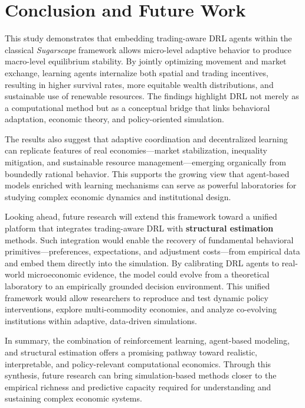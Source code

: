 \documentclass[pdflatex,sn-mathphys-num]{sn-jnl}%
\theoremstyle{thmstyleone}%
\theoremstyle{thmstyletwo}%
\theoremstyle{thmstylethree}%
\begin{document}
\section{Conclusion and Future Work}

This study demonstrates that embedding trading-aware DRL agents within the classical \textit{Sugarscape} framework allows micro-level adaptive behavior to produce macro-level equilibrium stability.  
By jointly optimizing movement and market exchange, learning agents internalize both spatial and trading incentives, resulting in higher survival rates, more equitable wealth distributions, and sustainable use of renewable resources.  
The findings highlight DRL not merely as a computational method but as a conceptual bridge that links behavioral adaptation, economic theory, and policy-oriented simulation.

The results also suggest that adaptive coordination and decentralized learning can replicate features of real economies—market stabilization, inequality mitigation, and sustainable resource management—emerging organically from boundedly rational behavior.  
This supports the growing view that agent-based models enriched with learning mechanisms can serve as powerful laboratories for studying complex economic dynamics and institutional design.

Looking ahead, future research will extend this framework toward a unified platform that integrates trading-aware DRL with \textbf{structural estimation} methods.  
Such integration would enable the recovery of fundamental behavioral primitives—preferences, expectations, and adjustment costs—from empirical data and embed them directly into the simulation.  
By calibrating DRL agents to real-world microeconomic evidence, the model could evolve from a theoretical laboratory to an empirically grounded decision environment.  
This unified framework would allow researchers to reproduce and test dynamic policy interventions, explore multi-commodity economies, and analyze co-evolving institutions within adaptive, data-driven simulations.

In summary, the combination of reinforcement learning, agent-based modeling, and structural estimation offers a promising pathway toward realistic, interpretable, and policy-relevant computational economics.  
Through this synthesis, future research can bring simulation-based methods closer to the empirical richness and predictive capacity required for understanding and sustaining complex economic systems.
\end{document}
